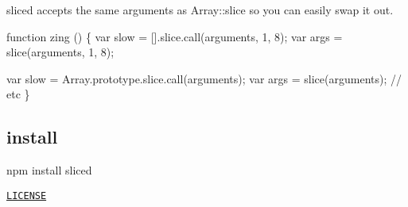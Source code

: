 {\ttfamily sliced} accepts the same arguments as {\ttfamily Array\+::slice} so you can easily swap it out.


\begin{DoxyCode}
function zing () \{
  var slow = [].slice.call(arguments, 1, 8);
  var args = slice(arguments, 1, 8);

  var slow = Array.prototype.slice.call(arguments);
  var args = slice(arguments);
  // etc
\}
\end{DoxyCode}


\subsection*{install}

\begin{DoxyVerb}npm install sliced
\end{DoxyVerb}


\href{https://github.com/aheckmann/sliced/blob/master/LICENSE}{\tt L\+I\+C\+E\+N\+SE} 